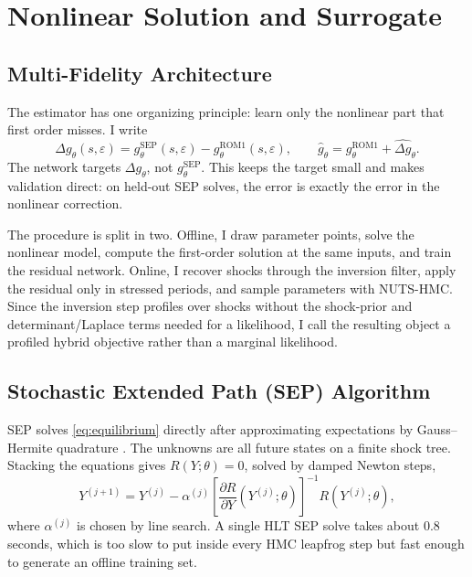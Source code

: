 \documentclass[12pt]{article}
\theoremstyle{plain}
\theoremstyle{definition}
\theoremstyle{remark}
\newcommand{\eps}{\varepsilon}
\begin{document}

\section{Nonlinear Solution and Surrogate}
\label{sec:methodology}

\subsection{Multi-Fidelity Architecture}
\label{subsec:multifidelity}

The estimator has one organizing principle: learn only the nonlinear part that
first order misses. I write
\[
  \Delta g_\theta(s,\eps)
  =
  g_\theta^{\mathrm{SEP}}(s,\eps)
  -
  g_\theta^{\mathrm{ROM1}}(s,\eps),
\qquad
  \hat g_\theta
  =
  g_\theta^{\mathrm{ROM1}}+\widehat{\Delta g}_\theta .
\]
The network targets \(\Delta g_\theta\), not \(g_\theta^{\mathrm{SEP}}\). This
keeps the target small and makes validation direct: on held-out SEP solves, the
error is exactly the error in the nonlinear correction.

The procedure is split in two. Offline, I draw parameter points, solve the
nonlinear model, compute the first-order solution at the same inputs, and train
the residual network. Online, I recover shocks through the inversion filter,
apply the residual only in stressed periods, and sample parameters with
NUTS-HMC. Since the inversion step profiles over shocks without the shock-prior
and determinant/Laplace terms needed for a likelihood, I call the resulting
object a profiled hybrid objective rather than a marginal likelihood.

\subsection{Stochastic Extended Path (SEP) Algorithm}
\label{subsec:sep}

SEP solves \eqref{eq:equilibrium} directly after approximating expectations by
Gauss--Hermite quadrature \citep{fair1983solution,adjemian2025stochastic}. The
unknowns are all future states on a finite shock tree. Stacking the equations
gives \(R(Y;\theta)=0\), solved by damped Newton steps,
\begin{equation}
\label{eq:newton_iteration}
Y^{(j+1)} = Y^{(j)} - \alpha^{(j)} \left[\frac{\partial R}{\partial Y}(Y^{(j)}; \theta)\right]^{-1} R(Y^{(j)}; \theta),
\end{equation}
where \(\alpha^{(j)}\) is chosen by line search. A single HLT SEP solve takes
about 0.8 seconds, which is too slow to put inside every HMC leapfrog step but
fast enough to generate an offline training set.
\end{document}

